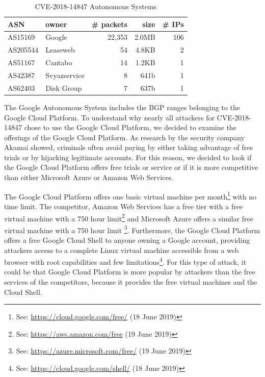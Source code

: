 \begin{table}[h]
\centering
\begin{tabular}{ |l|l|r|r|r| } 
\hline
ASN & owner & \# packets & size & \# IPs \\ \hline
AS15169 & Google & 22,353 & 2.0MB & 106 \\ \hline
AS205544 & Leaseweb & 54 & 4.8KB & 2 \\ \hline
AS51167 & Cantabo & 14 & 1.2KB & 1 \\ \hline
AS42387 & Svyazservice & 8 & 641b & 1 \\ \hline
AS62403 & Disk Group & 7 & 637b & 1 \\ \hline
\end{tabular}
\caption{CVE-2018-14847 Autonomous Systems}
\label{table:asn-cve-14847}
\end{table}

The Google Autonomous System includes the BGP ranges belonging to the Google Cloud Platform. To understand why nearly all attackers for CVE-2018-14847 chose to use the Google Cloud Platform, we decided to examine the offerings of the Google Cloud Platform. As research by the security company Akamai showed, criminals often avoid paying by either taking advantage of free trials or by hijacking legitimate accounts. For this reason, we decided to look if the Google Cloud Platform offers free trials or service or if it is more competitive than either Microsoft Azure or Amazon Web Services.

The Google Cloud Platform offers one basic virtual machine per month\footnote{See: \url{https://cloud.google.com/free/} (18 June 2019)} with no time limit. The competitor, Amazon Web Services has a free tier with a free virtual machine with a 750 hour limit\footnote{See: \url{https://aws.amazon.com/free} (19 June 2019)} and Microsoft Azure offers a similar free virtual machine with a 750 hour limit \footnote{See: \url{https://azure.microsoft.com/free/} (19 June 2019)}. Furthermore, the Google Cloud Platform offers a free Google Cloud Shell to anyone owning a Google account, providing attackers access to a complete Linux virtual machine accessible from a web browser with root capabilities and few limitations\footnote{See: \url{https://cloud.google.com/shell/} (18 June 2019)}. For this type of attack, it could be that Google Cloud Platform is more popular by attackers than the free services of the competitors, because it provides the free virtual machines and the Cloud Shell.

